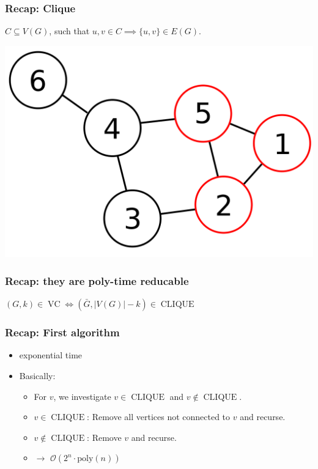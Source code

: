 \documentclass[11pt]{beamer}
\DeclareMathOperator{\VC}{VC}
\DeclareMathOperator{\CLIQUE}{CLIQUE}
\begin{document}
\begin{frame}
\frametitle{Recap: Clique}

$C \subseteq V(G)$, such that $u, v \in C \implies \{u, v\} \in E(G)$. \\


\begin{center}

{
\centering
\includegraphics[scale=0.2]{example_clique}
}

\end{center}

\end{frame}


\begin{frame}
\frametitle{Recap: they are poly-time reducable}

$(G, k) \in \VC \iff (\bar G, |V(G)|-k) \in \CLIQUE$
\end{frame}


\begin{frame}
\frametitle{Recap: First algorithm}

\begin{itemize}
\item exponential time
\item Basically:
\begin{itemize}
\item For $v$, we investigate $v \in \CLIQUE$ and $v \not \in \CLIQUE$.
\item $v \in \CLIQUE$: Remove all vertices not connected to $v$ and recurse.
\item $v \not \in \CLIQUE$: Remove $v$ and recurse.
\vspace*{5mm}
\item [] $\rightarrow$ $\mathcal{O}(2^n \cdot \text{poly}(n))$
\end{itemize}
\end{itemize}

\end{frame}
\end{document}
